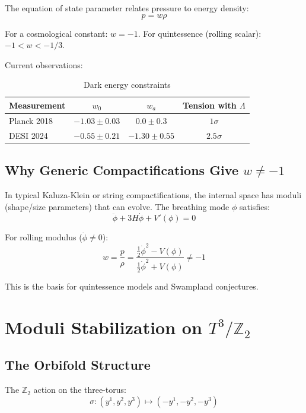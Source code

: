 \documentclass[12pt,a4paper]{article}
\begin{document}
The equation of state parameter relates pressure to energy density:
\begin{equation}
p = w \rho
\end{equation}

For a cosmological constant: $w = -1$. For quintessence (rolling scalar): $-1 < w < -1/3$.

Current observations:
\begin{table}[h]
\centering
\begin{tabular}{lccc}
\toprule
Measurement & $w_0$ & $w_a$ & Tension with $\Lambda$ \\
\midrule
Planck 2018 & $-1.03 \pm 0.03$ & $0.0 \pm 0.3$ & $1\sigma$ \\
DESI 2024 & $-0.55 \pm 0.21$ & $-1.30 \pm 0.55$ & $2.5\sigma$ \\
\bottomrule
\end{tabular}
\caption{Dark energy constraints}
\end{table}

\subsection{Why Generic Compactifications Give $w \neq -1$}

In typical Kaluza-Klein or string compactifications, the internal space has moduli (shape/size parameters) that can evolve. The breathing mode $\phi$ satisfies:
\begin{equation}
\ddot{\phi} + 3H\dot{\phi} + V'(\phi) = 0
\end{equation}

For rolling modulus ($\dot{\phi} \neq 0$):
\begin{equation}
w = \frac{p}{\rho} = \frac{\frac{1}{2}\dot{\phi}^2 - V(\phi)}{\frac{1}{2}\dot{\phi}^2 + V(\phi)} \neq -1
\end{equation}

This is the basis for quintessence models and Swampland conjectures.

\section{Moduli Stabilization on $T^3/\mathbb{Z}_2$}

\subsection{The Orbifold Structure}

The $\mathbb{Z}_2$ action on the three-torus:
\begin{equation}
\sigma: (y^1, y^2, y^3) \mapsto (-y^1, -y^2, -y^3)
\end{equation}
\end{document}

